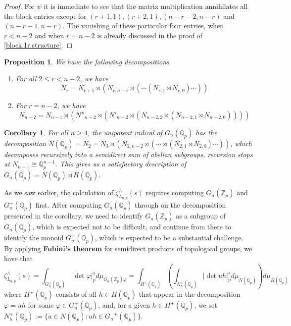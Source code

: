 \documentclass[12pt]{article}
\newtheorem{proposition}[theorem]{Proposition}
\newtheorem{corollary}[theorem]{Corollary}
\begin{document}
\begin{proof}
For $\psi$ it is immediate to see that the matrix multiplication annihilates all the block entries except for $(r+1,1),(r+2,1),(n-r-2,n-r)$ and $(n-r-1,n-r)$. The vanishing of these particular four entries, when $r<n-2$ and when $r=n-2$ is already discussed in the proof of \ref{block.1r.structure}. 
\end{proof}
\begin{proposition}
We have the following decompositions
\begin{enumerate}
    \item 
For all $2\leq{r}<{n-2}$, we have \[N_{r}=N_{r+1}\rtimes(N_{r,n-r}\rtimes(\cdots(N_{r,1}\rtimes{N_{r,0}})\cdots))\]
\item For $r=n-2$, we have \[N_{n-2}=N_{n-1}\rtimes(N''_{n-2}\rtimes(N'_{n-2}\rtimes(N_{n-2,2}\rtimes(N_{n-2,1}\rtimes{N_{n-2,0}}))))\]
\end{enumerate}
\end{proposition}
\begin{corollary}
For all $n\geq{4}$, the unipotent radical of $G_{n}(\mathbb{Q}_{p})$ has the decomposition $N(\mathbb{Q}_{p})=N_{2}=N_{3}\rtimes(N_{2,n-2}\rtimes(\cdots\rtimes(N_{2,1}\rtimes{N_{2,0}})\cdots))$, which decomposes recursively into a semidirect sum of abelian subgroups, recursion stops at $N_{n-1}\cong\mathbb{Q}_{p}^{n-1}$. This gives us a satisfactory description of $G_{n}(\mathbb{Q}_{p})=N(\mathbb{Q}_{p})\rtimes{H(\mathbb{Q}_{p})}$.
\end{corollary}
As we saw earlier, the calculation of $\zeta_{L_{n,p}}^{\wedge}(s)$ requires computing $G_{n}(\mathbb{Z}_p)$ and $G_{n}^{+}(\mathbb{Q}_p)$ first. After computing $G_{n}(\mathbb{Q}_p)$ through on the decomposition presented in the corollary, we need to identify $G_{n}(\mathbb{Z}_p)$ as a subgroup of $G_{n}(\mathbb{Q}_p)$, which is expected not to be difficult, and continue from there to identify the monoid $G_{n}^{+}(\mathbb{Q}_p)$, which is expected to be a substantial challenge. By applying \textbf{Fubini's theorem} for semidirect products of topological groups, we have that \[\zeta_{L_{n,p}}^{\wedge}(s)=\displaystyle\int_{G_{n}^{+}(\mathbb{Q}_p)}|\det\varphi|_p^sd\mu_{G_{n}(\mathbb{Z}_p)\varphi}=\displaystyle\int_{H^+(\mathbb{Q}_p)}\left(\displaystyle\int_{N_{h}^+(\mathbb{Q}_p)}|\det{uh}|_p^sd\mu_{N(\mathbb{Q}_p)}\right)d\mu_{H(\mathbb{Q}_p)}\]
where $H^+(\mathbb{Q}_p)$ consists of all $h\in H(\mathbb{Q}_p)$ that appear in the decomposition $\varphi=uh$ for some $\varphi\in G_{n}^{+}(\mathbb{Q}_p)$, and, for a given $h\in H^+(\mathbb{Q}_p)$, we set $N_h^+(\mathbb{Q}_p):=\{u\in N(\mathbb{Q}_p) : uh\in{G_{n}}^+(\mathbb{Q}_p)\}$. 
\end{document}
